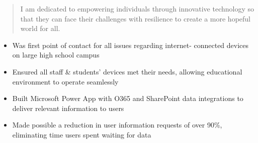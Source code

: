 



\ifexcludephoto
\else
\fi

\makecvheader

\begin{quote}
  \noindent
  I am dedicated to empowering individuals through innovative
  technology so that they can face their challenges with
  resilience to create a more hopeful world for all.
\end{quote}

\par\smallskip
\noindent
\begin{minipage}{20cm}
  \begin{minipage}{9.75cm}
    \begin{itemize}
      \item Was first point of contact for all issues regarding internet-
            connected devices on large high school campus
      \item Ensured all staff \& students' devices met their needs,
            allowing educational environment to operate seamlessly
    \end{itemize}
  \end{minipage}
  \hfill
  \begin{minipage}{9.75cm}
    \begin{itemize}
      \item Built Microsoft Power App with O365 and SharePoint data
            integrations to deliver relevant information to users
      \item Made possible a reduction in user information requests of
            over 90\%, eliminating time users spent waiting for data
    \end{itemize}
  \end{minipage}
\end{minipage}
\par\smallskip
\divider

